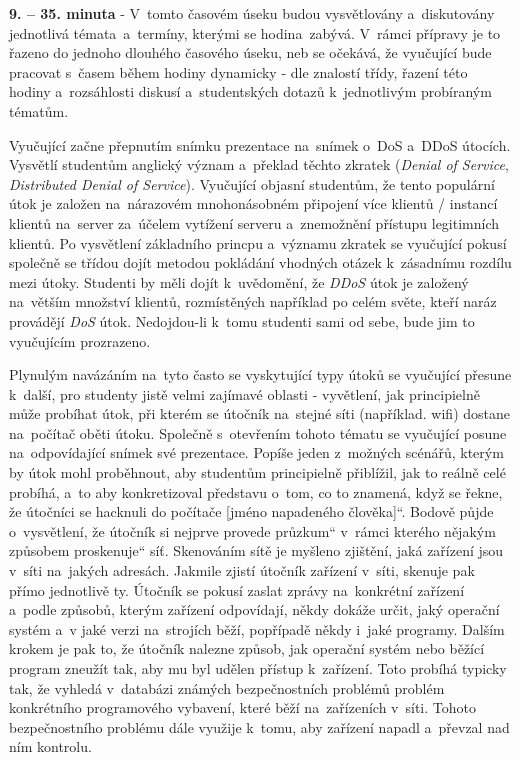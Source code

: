 \documentclass[a4paper, 12pt]{article}
\providecommand{\uv}[1]{\quotedblbase #1\textquotedblleft}
\begin{document}
\textbf{9. -- 35. minuta} - V~tomto časovém úseku budou vysvětlovány a~diskutovány jednotlivá témata~a~termíny, kterými se hodina~zabývá. V~rámci přípravy je to řazeno do jednoho dlouhého časového úseku, neb se očekává, že vyučující bude pracovat s~časem během hodiny dynamicky - dle znalostí třídy, řazení této hodiny a~rozsáhlosti diskusí a~studentských dotazů k~jednotlivým probíraným tématům.

Vyučující začne přepnutím snímku prezentace na~snímek o~DoS a~DDoS útocích. Vysvětlí studentům anglický význam a~překlad těchto zkratek (\textit{Denial of Service}, \textit{Distributed Denial of Service}). Vyučující objasní studentům, že tento populární útok je založen na~nárazovém mnohonásobném připojení více klientů / instancí klientů na~server za~účelem vytížení serveru a~znemožnění přístupu legitimních klientů. Po vysvětlení základního princpu a~významu zkratek se vyučující pokusí společně se třídou dojít metodou pokládání vhodných otázek k~zásadnímu rozdílu mezi útoky. Studenti by měli dojít k~uvědomění, že \textit{DDoS} útok je založený na~větším množství klientů, rozmístěných například po celém světe, kteří naráz provádějí \textit{DoS} útok. Nedojdou-li k~tomu studenti sami od sebe, bude jim to vyučujícím prozrazeno.

Plynulým navázáním na~tyto často se vyskytující typy útoků se vyučující přesune k~další, pro studenty jistě velmi zajímavé oblasti - vyvětlení, jak principielně může probíhat útok, při kterém se útočník na~stejné síti (například. wifi) dostane na~počítač oběti útoku. Společně s~otevřením tohoto tématu se vyučující posune na~odpovídající snímek své prezentace. Popíše jeden z~možných scénářů, kterým by útok mohl proběhnout, aby studentům principielně přiblížil, jak to reálně celé probíhá, a~to aby konkretizoval představu o~tom, co to znamená, když se řekne, že \uv{útočníci se hacknuli do počítače [jméno napadeného člověka]}. Bodově půjde o~vysvětlení, že útočník si nejprve provede \uv{průzkum} v~rámci kterého nějakým způsobem \uv{proskenuje} síť. Skenováním sítě je myšleno zjištění, jaká zařízení jsou v~síti na~jakých adresách. Jakmile zjistí útočník zařízení v~síti, skenuje pak přímo jednotlivě ty. Útočník se pokusí zaslat zprávy na~konkrétní zařízení a~podle způsobů, kterým zařízení odpovídají, někdy dokáže určit, jaký operační systém a~v jaké verzi na~strojích běží, popřípadě někdy i~jaké programy. Dalším krokem je pak to, že útočník nalezne způsob, jak operační systém nebo běžící program zneužít tak, aby mu byl udělen přístup k~zařízení. Toto probíhá typicky tak, že vyhledá v~databázi známých bezpečnostních problémů problém konkrétního programového vybavení, které běží na~zařízeních v~síti. Tohoto bezpečnostního problému dále využije k~tomu, aby zařízení napadl a~převzal nad ním kontrolu.
\end{document}
